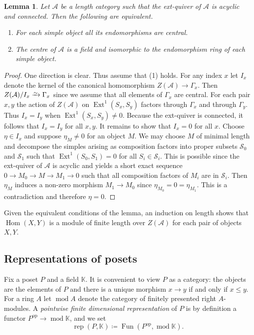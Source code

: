 \documentclass[a4paper]{amsart}
\theoremstyle{plain}
\newtheorem{lem}[thm]{Lemma}
\theoremstyle{definition}
\theoremstyle{remark}
\numberwithin{equation}{section}
\newcommand{\Ext}{\operatorname{Ext}}
\newcommand{\Fun}{\operatorname{Fun}}
\newcommand{\Hom}{\operatorname{Hom}}
\renewcommand{\mod}{\operatorname{mod}}
\newcommand{\rep}{\operatorname{rep}}
\newcommand{\op}{\mathrm{op}}
\newcommand{\iso}{\xrightarrow{\raisebox{-.4ex}[0ex][0ex]{$\scriptstyle{\sim}$}}}
\def\A{\mathcal A}
\def\calS{\mathcal S}
\def\bbK{\mathbb K}
\def\Ga{\Gamma}
\begin{document}
\begin{lem}\label{le:centre}
  Let $\A$ be a length category such that the ext-quiver of $\A$ is
  acyclic and connected. Then the following are equivalent.
  \begin{enumerate}
  \item For each simple object all its endomorphisms are central.
  \item The centre of $\A$ is a field and isomorphic to the
    endomorphism ring of each simple object.
  \end{enumerate}
\end{lem}
\begin{proof}
  One direction is clear. Thus assume that (1) holds. For any index
  $x$ let $I_x$ denote the kernel of the canonical homomorphism
  $Z(\A)\to \Ga_x$.  Then $Z(\A)/I_x\iso \Ga_{x}$ since we assume that
  all elements of $\Ga_{x}$ are central.  For each pair $x,y$ the
  action of $Z(\A)$ on $\Ext^1(S_x,S_y)$ factors through $\Ga_x$ and
  through $\Ga_y$.  Thus $I_x=I_y$ when $\Ext^1(S_x,S_y)\neq 0$.
  Because the ext-quiver is connected, it follows that $I_x=I_y$ for
  all $x,y$. It remains to show that $I_x=0$ for all $x$. Choose
  $\eta\in I_x$ and suppose $\eta_M\neq 0$ for an object $M$. We may
  choose $M$ of minimal length and decompose the simples arising as
  composition factors into proper subsets $\calS_0$ and $\calS_1$ such
  that $\Ext^1(S_0,S_1)=0$ for all $S_i\in\calS_i$. This is possible
  since the ext-quiver of $\A$ is acyclic and yields a short exact
  sequence $0\to M_0\to M\to M_1\to 0$ such that all composition
  factors of $M_i$ are in $\calS_i$. Then $\eta_M$ induces a
  non-zero morphism $M_1\to M_0$ since $\eta_{M_0}=0=\eta_{M_1}$. This is a
  contradiction and therefore $\eta=0$.
\end{proof}

Given the equivalent conditions of the lemma, an induction on length
shows that $\Hom(X,Y)$ is a module of finite length over $Z(\A)$ for
each pair of objects $X,Y$.


\subsection*{Representations of posets}

Fix a poset $P$ and a field $\bbK$. It is convenient to view $P$ as a
category: the objects are the elements of $P$ and there is a unique
morphism $x\to y$ if and only if $x\le y$. For a ring $A$ let $\mod A$
denote the category of finitely presented right $A$-modules.
A \emph{pointwise
  finite dimensional representation} of $P$ is by definition a functor
$P^\op\to\mod\bbK$, and we set
\[\rep(P,\bbK)\coloneqq \Fun(P^\op,\mod\bbK).\]
\end{document}
